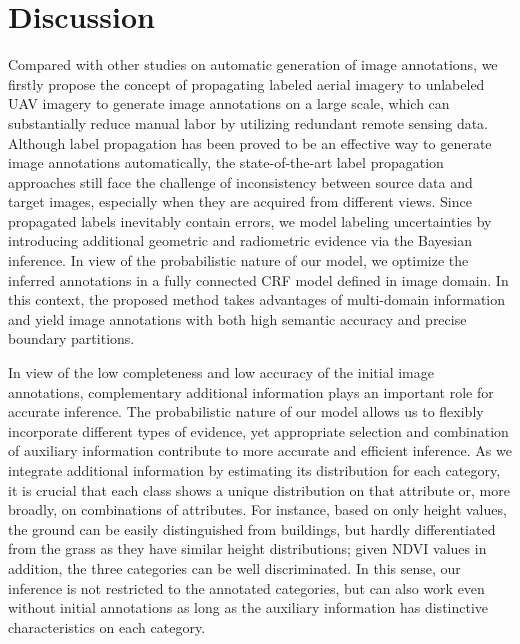 \section{Discussion}
\label{sec:disc}
Compared with other studies on automatic generation of image annotations, we firstly propose the concept of propagating labeled aerial imagery to unlabeled UAV imagery to generate image annotations on a large scale, which can substantially reduce manual labor by utilizing redundant remote sensing data. Although label propagation has been proved to be an effective way to generate image annotations automatically, the state-of-the-art label propagation approaches still face the challenge of inconsistency between source data and target images, especially when they are acquired from different views. Since propagated labels inevitably contain errors, we model labeling uncertainties by introducing additional geometric and radiometric evidence via the Bayesian inference. In view of the probabilistic nature of our model, we optimize the inferred annotations in a fully connected CRF model defined in image domain. In this context, the proposed method takes advantages of multi-domain information and yield image annotations with both high semantic accuracy and precise boundary partitions.

In view of the low completeness and low accuracy of the initial image annotations, complementary additional information plays an important role for accurate inference. The probabilistic nature of our model allows us to flexibly incorporate different types of evidence, yet appropriate selection and combination of auxiliary information contribute to more accurate and efficient inference. As we integrate additional information by estimating its distribution for each category, it is crucial that each class shows a unique distribution on that attribute or, more broadly, on combinations of attributes. For instance, based on only height values, the ground can be easily distinguished from buildings, but hardly differentiated from the grass as they have similar height distributions; given NDVI values in addition, the three categories can be well discriminated. In this sense, our inference is not restricted to the annotated categories, but can also work even without initial annotations as long as the auxiliary information has distinctive characteristics on each category. 


